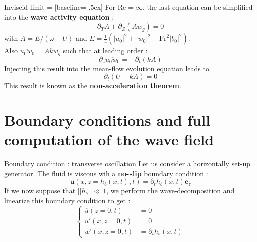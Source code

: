 \documentclass[10pt]{beamer}
\begin{document}
\begin{frame}[fragile]{Inviscid limit}
   = [baseline=-.5ex]
  For $\mathrm{Re}=\infty$, the last equation can be simplified into the \textbf{wave activity equation} :
  \begin{equation*}
  	\partial_{T}A+\partial_{Z}\left(A w_{g}\right)=0
  \end{equation*}
  with $A=E/\left(\omega-U\right)$ and $E=\frac{1}{4}\left(\left\lvert u_{0}\right\rvert^{2}+\left\lvert w_{0}\right\rvert^{2}+\mathrm{Fr}^{2}\left\lvert b_{0}\right\rvert^{2}\right)$. \\
  Also $\overline{u_{0}w_{0}}=Akw_{g}$ such that at leading order :
  \begin{equation*}
  	\partial_{z}\overline{u_{0}w_{0}}=-\partial_{t}\left(kA\right)
  \end{equation*}
  Injecting this result into the mean\--flow evolution equation leads to 
  \begin{equation*}
  	\partial_{t}\left(U-kA\right)=0
  \end{equation*}
  This result is known as the \textbf{non-acceleration theorem}.
\end{frame}

\section{Boundary conditions and full computation of the wave field}

\begin{frame}{Boundary condition : transverse oscillation}
	Let us consider a horizontally set-up generator. The fluid is viscous wih a \textbf{no\--slip} boundary condition :
	\begin{equation*}
		\mathbf{u}\left(x,z=h_{b}\left(x,t\right),t\right)=\partial_{t}h_{b}\left(x,t\right)\mathbf{e}_{z}
	\end{equation*}
	If we now suppose that $\left\lvert\left\lvert h_{b}\right\rvert\right\rvert\ll1$, we perform the wave\--decomposition and linearize this boundary condition to get :
	\begin{equation*}
		\begin{cases}
			\overline{u}\left(z=0,t\right)&=0\\
			u'\left(x,z=0,t\right)&=0\\
			w'\left(x,z=0,t\right)&=\partial_{t}h_{b}\left(x,t\right)
		\end{cases}
	\end{equation*}
\end{frame}
\end{document}
